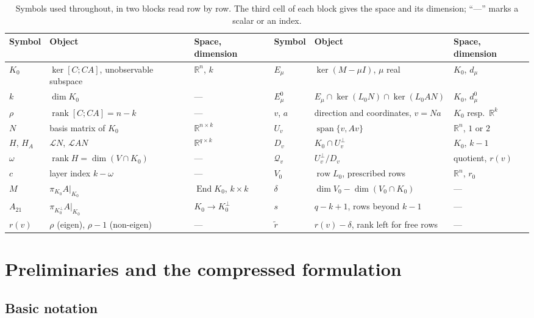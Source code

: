 \documentclass[journal]{IEEEtran}
\theoremstyle{plainn}
\theoremstyle{remark}
\newcommand{\row}{\operatorname{row}}
\newcommand{\rank}{\operatorname{rank}}
\begin{document}
\begin{table}[t]
\centering
\caption{Symbols used throughout, in two blocks read row by row. The third cell of each block gives
the space and its dimension; ``---'' marks a scalar or an index.}
\label{tab:notation}
\small
\begin{tabular}{@{}llllll@{}}
\toprule
Symbol & Object & Space, dimension & Symbol & Object & Space, dimension \\
\midrule
$K_0$ & $\ker[C;CA]$, unobservable subspace & $\mathbb R^n$, $k$ &
$E_\mu$ & $\ker(M-\mu I)$, $\mu$ real & $K_0$, $d_\mu$ \\
$k$ & $\dim K_0$ & --- &
$E_\mu^0$ & $E_\mu\cap\ker(L_0N)\cap\ker(L_0AN)$ & $K_0$, $d_\mu^0$ \\
$\rho$ & $\rank[C;CA]=n-k$ & --- &
$v$, $a$ & direction and coordinates, $v=Na$ & $K_0$ resp.\ $\mathbb R^k$ \\
$N$ & basis matrix of $K_0$ & $\mathbb R^{n\times k}$ &
$U_v$ & $\operatorname{span}\{v,Av\}$ & $\mathbb R^n$, $1$ or $2$ \\
$H$, $H_A$ & $\mathcal LN$, $\mathcal LAN$ & $\mathbb R^{q\times k}$ &
$D_v$ & $K_0\cap U_v^\perp$ & $K_0$, $k-1$ \\
$\omega$ & $\rank H=\dim(V\cap K_0)$ & --- &
$\mathcal Q_v$ & $U_v^\perp/D_v$ & quotient, $r(v)$ \\
$c$ & layer index $k-\omega$ & --- &
$V_0$ & $\row L_0$, prescribed rows & $\mathbb R^n$, $r_0$ \\
$M$ & $\pi_{K_0}A|_{K_0}$ & $\operatorname{End}K_0$, $k\times k$ &
$\delta$ & $\dim V_0-\dim(V_0\cap K_0)$ & --- \\
$A_{21}$ & $\pi_{K_0^\perp}A|_{K_0}$ & $K_0\to K_0^\perp$ &
$s$ & $q-k+1$, rows beyond $k-1$ & --- \\
$r(v)$ & $\rho$ (eigen), $\rho-1$ (non-eigen) & --- &
$\widetilde r$ & $r(v)-\delta$, rank left for free rows & --- \\
\bottomrule
\end{tabular}
\end{table}

\section{Preliminaries and the compressed formulation}
\label{sec:prelim}

\subsection{Basic notation}
\label{sec:prelim:notation}
\end{document}
